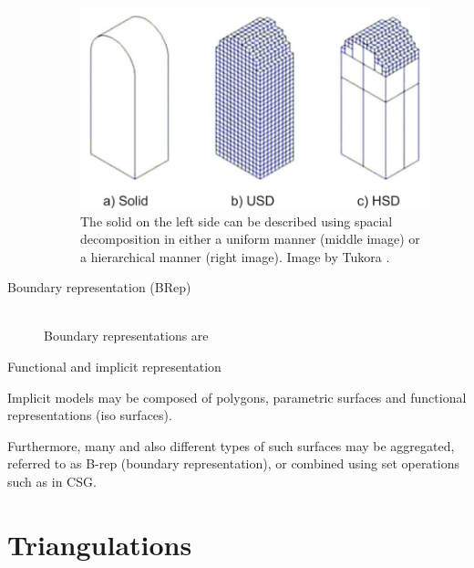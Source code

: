 \begin{description}
	\begin{figure}[h]
		\centering
		\includegraphics[width=\textwidth]{images/spacial_decomposition}
		\caption{
			The solid on the left side can be described using spacial decomposition in either a uniform manner (middle image) or a hierarchical manner (right image).
			Image by Tukora \cite{virtual_machining_review}. 
		}
		\label{fig:spacial_decomposition}
	\end{figure}
	

	\item[Boundary representation (BRep)] \hfill \\
	Boundary representations are 
	
	\item[Functional and implicit representation]
	
	
\end{description}

Implicit models may be composed of polygons, parametric surfaces and functional representations (iso surfaces).

Furthermore, many and also different types of such surfaces may be aggregated, referred to as B-rep (boundary representation), or combined using set operations such as in CSG.



\section{Triangulations}
\label{sec:definitions}


